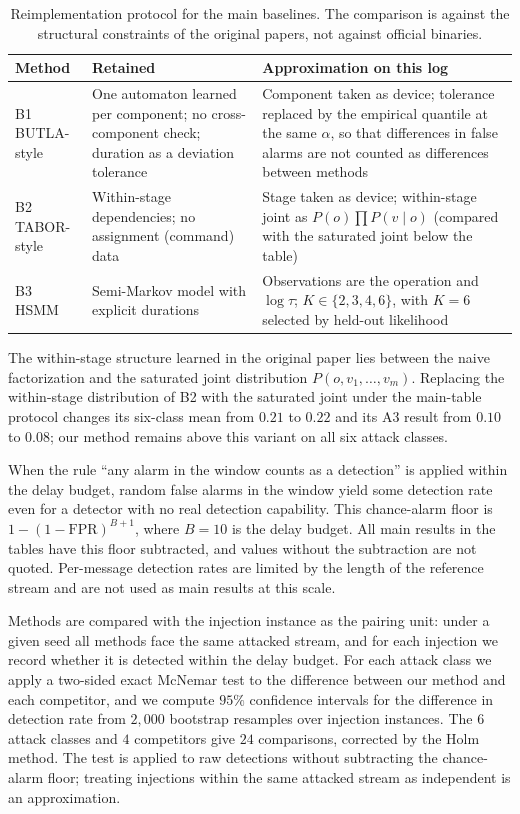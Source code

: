 \documentclass[manuscript,screen,review]{acmart}
\begin{document}
\begin{table}[!t]
\renewcommand{\arraystretch}{1.12}
\caption{Reimplementation protocol for the main baselines. The comparison is against the structural constraints of the original papers, not against official binaries.}
\label{tab:repro}
\centering
\small
\begin{tabular}{lL{3.4cm}L{4.4cm}}
\toprule
Method & Retained & Approximation on this log \\
\midrule
{B1} {BUTLA}-style~\cite{maier2011timed}
  & One automaton learned per component; no cross-component check; duration as a deviation tolerance
  & Component taken as device; tolerance replaced by the empirical quantile at the same $\alpha$, so that differences in false alarms are not counted as differences between methods \\
{B2} {TABOR}-style~\cite{lin2018tabor}
  & Within-stage dependencies; no assignment (command) data
  & Stage taken as device; within-stage joint as $P(o)\prod P(v\mid o)$ (compared with the saturated joint below the table) \\
{B3} {HSMM}~\cite{tan2008hsmm}
  & Semi-Markov model with explicit durations
  & Observations are the operation and $\log\tau$; $K\in\{2,3,4,6\}$, with $K=6$ selected by held-out likelihood \\
\bottomrule
\end{tabular}
\end{table}

The within-stage structure learned in the original paper lies between the naive factorization and the saturated joint distribution $P(o,v_1,\dots,v_m)$. Replacing the within-stage distribution of {B2} with the saturated joint under the main-table protocol changes its six-class mean from $0.21$ to $0.22$ and its {A3} result from $0.10$ to $0.08$; our method remains above this variant on all six attack classes.

When the rule ``any alarm in the window counts as a detection'' is applied within the delay budget, random false alarms in the window yield some detection rate even for a detector with no real detection capability. This chance-alarm floor is $1-(1-\mathrm{FPR})^{B+1}$, where $B=10$ is the delay budget. All main results in the tables have this floor subtracted, and values without the subtraction are not quoted. Per-message detection rates are limited by the length of the reference stream and are not used as main results at this scale.

Methods are compared with the injection instance as the pairing unit: under a given seed all methods face the same attacked stream, and for each injection we record whether it is detected within the delay budget. For each attack class we apply a two-sided exact {McNemar} test to the difference between our method and each competitor, and we compute $95\%$ confidence intervals for the difference in detection rate from $2{,}000$ bootstrap resamples over injection instances. The $6$ attack classes and $4$ competitors give $24$ comparisons, corrected by the {Holm} method. The test is applied to raw detections without subtracting the chance-alarm floor; treating injections within the same attacked stream as independent is an approximation.
\end{document}
